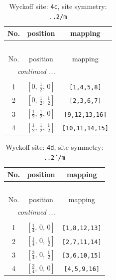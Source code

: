 \documentclass[fleqn,8pt]{jsarticle}
\begin{document}
\renewcommand{\arraystretch}{1.2}
\begin{longtable}{ccc}
\caption{Wyckoff site: {\tt 4c}, site symmetry: {\tt ..2/m}}
 \\
 \hline \hline
No. & position & mapping \\ \hline \endfirsthead

\multicolumn{2}{l}{\tablename\ \thetable{}} \\
 \hline \hline
No. & position & mapping \\ \hline \endhead

 \hline \hline
\multicolumn{2}{r}{\footnotesize\it continued ...} \\ \endfoot

 \hline \hline
\multicolumn{2}{r}{} \\ \endlastfoot

1 & $\left[ 0,\, \frac{1}{2},\, 0 \right]$ & {\tt [1,4,5,8]} \\ \hline
2 & $\left[ 0,\, \frac{1}{2},\, \frac{1}{2} \right]$ & {\tt [2,3,6,7]} \\ \hline
3 & $\left[ \frac{1}{2},\, \frac{1}{2},\, 0 \right]$ & {\tt [9,12,13,16]} \\ \hline
4 & $\left[ \frac{1}{2},\, \frac{1}{2},\, \frac{1}{2} \right]$ & {\tt [10,11,14,15]} \\
\end{longtable}
\renewcommand{\arraystretch}{1.2}
\begin{longtable}{ccc}
\caption{Wyckoff site: {\tt 4d}, site symmetry: {\tt ..2'/m}}
 \\
 \hline \hline
No. & position & mapping \\ \hline \endfirsthead

\multicolumn{2}{l}{\tablename\ \thetable{}} \\
 \hline \hline
No. & position & mapping \\ \hline \endhead

 \hline \hline
\multicolumn{2}{r}{\footnotesize\it continued ...} \\ \endfoot

 \hline \hline
\multicolumn{2}{r}{} \\ \endlastfoot

1 & $\left[ \frac{1}{4},\, 0,\, 0 \right]$ & {\tt [1,8,12,13]} \\ \hline
2 & $\left[ \frac{1}{4},\, 0,\, \frac{1}{2} \right]$ & {\tt [2,7,11,14]} \\ \hline
3 & $\left[ \frac{3}{4},\, 0,\, \frac{1}{2} \right]$ & {\tt [3,6,10,15]} \\ \hline
4 & $\left[ \frac{3}{4},\, 0,\, 0 \right]$ & {\tt [4,5,9,16]} \\
\end{longtable}
\end{document}
